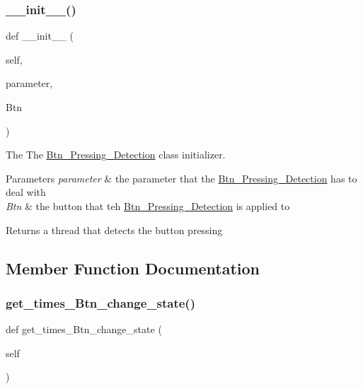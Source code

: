 \subsubsection{\texorpdfstring{\+\_\+\+\_\+init\+\_\+\+\_\+()}{\_\_init\_\_()}}
{\footnotesize\ttfamily def \+\_\+\+\_\+init\+\_\+\+\_\+ (\begin{DoxyParamCaption}\item[{}]{self,  }\item[{}]{parameter,  }\item[{}]{Btn }\end{DoxyParamCaption})}



The The \hyperlink{a00029}{Btn\+\_\+\+Pressing\+\_\+\+Detection} class initializer. 


\begin{DoxyParams}{Parameters}
{\em parameter} & the parameter that the \hyperlink{a00029}{Btn\+\_\+\+Pressing\+\_\+\+Detection} has to deal with \\
\hline
{\em Btn} & the button that teh \hyperlink{a00029}{Btn\+\_\+\+Pressing\+\_\+\+Detection} is applied to \\
\hline
\end{DoxyParams}
\begin{DoxyReturn}{Returns}
a thread that detects the button pressing 
\end{DoxyReturn}


\subsection{Member Function Documentation}
\mbox{\label{a00029_a939c51dd418f370caad2689fb0d438b6}} 
\subsubsection{\texorpdfstring{get\+\_\+times\+\_\+\+Btn\+\_\+change\+\_\+state()}{get\_times\_Btn\_change\_state()}}
{\footnotesize\ttfamily def get\+\_\+times\+\_\+\+Btn\+\_\+change\+\_\+state (\begin{DoxyParamCaption}\item[{}]{self }\end{DoxyParamCaption})}



